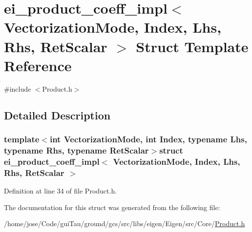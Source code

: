 \hypertarget{structei__product__coeff__impl}{\section{ei\-\_\-product\-\_\-coeff\-\_\-impl$<$ Vectorization\-Mode, Index, Lhs, Rhs, Ret\-Scalar $>$ Struct Template Reference}
\label{structei__product__coeff__impl}
}


{\ttfamily \#include $<$Product.\-h$>$}



\subsection{Detailed Description}
\subsubsection*{template$<$int Vectorization\-Mode, int Index, typename Lhs, typename Rhs, typename Ret\-Scalar$>$struct ei\-\_\-product\-\_\-coeff\-\_\-impl$<$ Vectorization\-Mode, Index, Lhs, Rhs, Ret\-Scalar $>$}



Definition at line 34 of file Product.\-h.



The documentation for this struct was generated from the following file\-:\begin{DoxyCompactItemize}
\item 
/home/jose/\-Code/gui\-Tau/ground/gcs/src/libs/eigen/\-Eigen/src/\-Core/\hyperlink{_product_8h}{Product.\-h}\end{DoxyCompactItemize}
